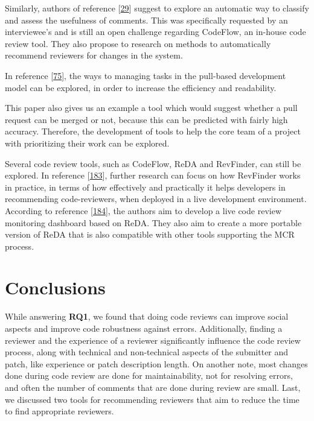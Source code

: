 \documentclass[]{book}
\begin{document}
Similarly, authors of reference
{[}\protect\hyperlink{ref-bird2015lessons}{29}{]} suggest to explore an
automatic way to classify and assess the usefulness of comments. This
was specifically requested by an interviewee's and is still an open
challenge regarding CodeFlow, an in-house code review tool. They also
propose to research on methods to automatically recommend reviewers for
changes in the system.

In reference {[}\protect\hyperlink{ref-gousios2014exploratory}{75}{]},
the ways to managing tasks in the pull-based development model can be
explored, in order to increase the efficiency and readability.

This paper also gives us an example a tool which would suggest whether a
pull request can be merged or not, because this can be predicted with
fairly high accuracy. Therefore, the development of tools to help the
core team of a project with prioritizing their work can be explored.

Several code review tools, such as CodeFlow, ReDA and RevFinder, can
still be explored. In reference
{[}\protect\hyperlink{ref-thongtanunam2015should}{183}{]}, further
research can focus on how RevFinder works in practice, in terms of how
effectively and practically it helps developers in recommending
code-reviewers, when deployed in a live development environment.
According to reference
{[}\protect\hyperlink{ref-thongtanunam2014reda}{184}{]}, the authors aim
to develop a live code review monitoring dashboard based on ReDA. They
also aim to create a more portable version of ReDA that is also
compatible with other tools supporting the MCR process.

\section{Conclusions}\label{conclusions}

While answering \textbf{RQ1}, we found that doing code reviews can
improve social aspects and improve code robustness against errors.
Additionally, finding a reviewer and the experience of a reviewer
significantly influence the code review process, along with technical
and non-technical aspects of the submitter and patch, like experience or
patch description length. On another note, most changes done during code
review are done for maintainability, not for resolving errors, and often
the number of comments that are done during review are small. Last, we
discussed two tools for recommending reviewers that aim to reduce the
time to find appropriate reviewers.
\end{document}
